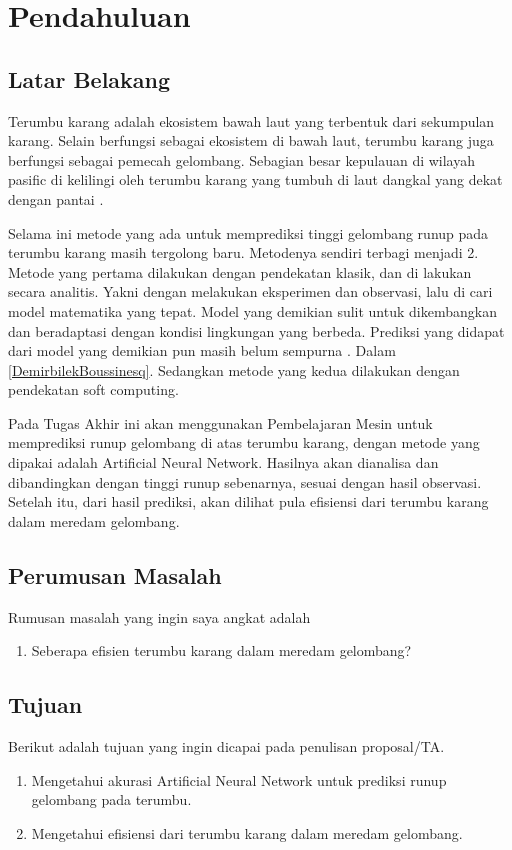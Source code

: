 \chapter{Pendahuluan}
\section{Latar Belakang}

Terumbu karang adalah ekosistem bawah laut yang terbentuk dari sekumpulan karang. Selain berfungsi sebagai ekosistem di bawah laut, terumbu karang juga berfungsi sebagai pemecah gelombang. Sebagian besar kepulauan di wilayah pasific di kelilingi oleh terumbu karang yang tumbuh di laut dangkal yang dekat dengan pantai \cite{DemirbilekBoussinesq}. 


Selama ini metode yang ada untuk memprediksi tinggi gelombang runup pada terumbu karang masih tergolong baru. Metodenya sendiri terbagi menjadi 2. Metode yang pertama dilakukan dengan pendekatan klasik, dan di lakukan secara analitis. Yakni dengan melakukan eksperimen dan observasi, lalu di cari model matematika yang tepat. Model yang demikian sulit untuk dikembangkan dan beradaptasi dengan kondisi lingkungan yang berbeda. Prediksi yang didapat dari model yang demikian pun masih belum sempurna \cite{DemirbilekBoussinesq}. Dalam \ref{DemirbilekBoussinesq}. Sedangkan metode yang kedua dilakukan dengan pendekatan soft computing.

Pada Tugas Akhir ini akan menggunakan Pembelajaran Mesin untuk memprediksi runup gelombang di atas terumbu karang, dengan metode yang dipakai adalah Artificial Neural Network. Hasilnya akan dianalisa dan dibandingkan dengan tinggi runup sebenarnya, sesuai dengan hasil observasi. Setelah itu, dari hasil prediksi, akan dilihat pula efisiensi dari terumbu karang dalam meredam gelombang.

\section{Perumusan Masalah}
Rumusan masalah yang ingin saya angkat adalah
\begin{enumerate}
    \item Seberapa efisien terumbu karang dalam meredam gelombang?
\end{enumerate}
\section{Tujuan}
Berikut adalah tujuan yang ingin dicapai pada penulisan proposal/TA.
\begin{enumerate}
    \item Mengetahui akurasi Artificial Neural Network untuk prediksi runup gelombang pada terumbu.
    \item Mengetahui efisiensi dari terumbu karang dalam meredam gelombang.
\end{enumerate}
